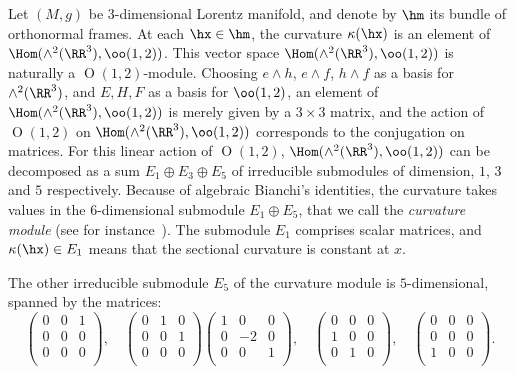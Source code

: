 Let $(M,g)$ be $3$-dimensional Lorentz manifold, and denote by $\hm$ its bundle of orthonormal frames. At each $\hx \in \hm$, the curvature $\kappa(\hx)$ is an element of $\Hom(\wedge^2(\RR^3),\oo(1,2))$. This vector space $\Hom(\wedge^2(\RR^3),\oo(1,2))$ is naturally a ${\operatorname O}(1,2)$-module. Choosing $e \wedge h$, $e \wedge f$, $h \wedge f$ as a basis for $\wedge^2(\RR^3)$, and $E,H,F$ as a basis for $\oo(1,2)$, an element of $\Hom(\wedge^2(\RR^3),\oo(1,2))$ is merely given by a $3 \times 3$ matrix, and the action of ${\operatorname O}(1,2)$ on $\Hom(\wedge^2(\RR^3),\oo(1,2))$ corresponds to the conjugation on matrices. For this linear action of ${\operatorname O}(1,2)$, $\Hom(\wedge^2(\RR^3),\oo(1,2))$ can be decomposed as a sum $E_1 \oplus E_3 \oplus E_5$ of irreducible submodules of dimension, $1$, $3$ and $5$ respectively. Because of algebraic Bianchi's identities, the curvature takes values in the $6$-dimensional submodule $E_1 \oplus E_5$, that we call the \emph{curvature module} (see for instance~\cite[Chapter~6]{sharpe}). The submodule $E_1$ comprises scalar matrices, and $\kappa(\hx) \in E_1$ means that the sectional curvature is constant at $x$.



The other irreducible submodule $E_5$ of the curvature module is $5$-dimensional, spanned by the matrices:
\[
\begin{pmatrix} 0&0&1\\ 0&0&0\\ 0&0&0\\
\end{pmatrix},\quad
\begin{pmatrix} 0&1&0\\ 0&0&1\\ 0&0&0\\
\end{pmatrix}
\begin{pmatrix}1&0&0\\ 0&-2 & 0\\0& 0& 1 \\
\end{pmatrix},\quad
\begin{pmatrix} 0&0&0\\ 1&0 &0 \\ 0 & 1 & 0\\
\end{pmatrix},\quad
\begin{pmatrix}
0&0&0 \\ 0&0&0 \\1&0&0 \\
\end{pmatrix}.
\]



